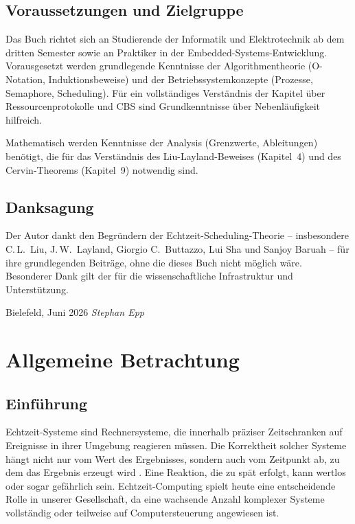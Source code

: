﻿\documentclass[a4paper,12pt]{report}
\theoremstyle{definition}
\begin{document}
\section*{Voraussetzungen und Zielgruppe}

Das Buch richtet sich an Studierende der Informatik und Elektrotechnik ab dem
dritten Semester sowie an Praktiker in der Embedded-Systems-Entwicklung.
Vorausgesetzt werden grundlegende Kenntnisse der Algorithmentheorie (O-Notation,
Induktionsbeweise) und der Betriebssystemkonzepte (Prozesse, Semaphore,
Scheduling). Für ein vollständiges Verständnis der Kapitel über Ressourcenprotokolle
und CBS sind Grundkenntnisse über Nebenläufigkeit hilfreich.

Mathematisch werden Kenntnisse der Analysis (Grenzwerte, Ableitungen) benötigt,
die für das Verständnis des Liu-Layland-Beweises (Kapitel~4) und des
Cervin-Theorems (Kapitel~9) notwendig sind.

\section*{Danksagung}

Der Autor dankt den Begründern der Echtzeit-Scheduling-Theorie -- insbesondere
C.\,L.\ Liu, J.\,W.\ Layland, Giorgio C.\ Buttazzo, Lui Sha und Sanjoy Baruah --
für ihre grundlegenden Beiträge, ohne die dieses Buch nicht möglich wäre.
Besonderer Dank gilt der für die wissenschaftliche
Infrastruktur und Unterstützung.

\bigskip
\noindent Bielefeld, Juni 2026 \hfill \textit{Stephan Epp}

\chapter{Allgemeine Betrachtung}
\label{chap:allgemein}

\section{Einführung}

Echtzeit-Systeme sind Rechnersysteme, die innerhalb präziser Zeitschranken auf Ereignisse
in ihrer Umgebung reagieren müssen. Die Korrektheit solcher Systeme hängt nicht nur
vom Wert des Ergebnisses, sondern auch vom Zeitpunkt ab, zu dem das Ergebnis
erzeugt wird \cite{Stankovic1988}. Eine Reaktion, die zu spät erfolgt, kann wertlos
oder sogar gefährlich sein. Echtzeit-Computing spielt heute eine entscheidende Rolle
in unserer Gesellschaft, da eine wachsende Anzahl komplexer Systeme vollständig oder
teilweise auf Computersteuerung angewiesen ist.
\end{document}

